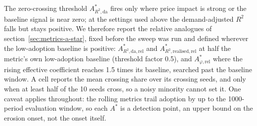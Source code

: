 \documentclass[12pt]{article}
\begin{document}
The zero-crossing threshold $A^{*}_{R^{2},\mathrm{da}}$ fires only where price impact is strong or the baseline signal is near zero; at the settings used above the demand-adjusted $R^{2}$ falls but stays positive. We therefore report the relative analogues of section~\ref{sec:metrics-a-star}, fixed before the sweep was run and defined wherever the low-adoption baseline is positive: %
$A^{*}_{R^{2},\mathrm{da},\mathrm{rel}}$ and $A^{*}_{R^{2},\mathrm{realised},\mathrm{rel}}$ at half the metric's own low-adoption baseline (threshold factor 0.5), and $A^{*}_{\varphi,\mathrm{rel}}$ where the rising effective coefficient reaches 1.5 times its baseline, searched past the baseline window. %
A cell reports the mean crossing share over its crossing seeds, and only when at least half of the 10 seeds cross, so a noisy minority cannot set it. %
One caveat applies throughout: the rolling metrics trail adoption by up to the 1000-period evaluation window, so each $A^{*}$ is a detection point, an upper bound on the erosion onset, not the onset itself. %
\end{document}
